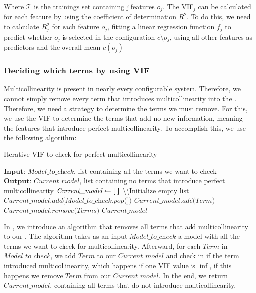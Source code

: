 Where $\mathcal{T}$ is the trainings set containing \textit{j} features $o_j$. The VIF$_{j}$ can be calculated for each feature by using the coefficient
of determination $R^2$. To do this, we need to calculate $R^{2}_j$ for each feature $o_j$, fitting a linear regression function $f_j$ to predict whether $o_j$
is selected in the configuration $c \setminus o_j$, using all other features as predictors and the overall mean $\overline{c}(o_j)$~\cite{Multicollinearity}.

\subsubsection{Deciding which terms by using VIF}
Multicollinearity is present in nearly every configurable system. 
Therefore, we cannot simply remove every term that introduces multicollinearity into the {\perfInfluenceModel}. 
Therefore, we need a strategy to determine the terms we must remove. For this, we use the VIF to determine the terms that add no new information, 
meaning the features that introduce perfect multicollinearity. To accomplish this, we use the following algorithm:

\begin{algorithm}
    \caption{Iterative VIF to check for perfect multicollinearity}\label{alg:vif_iterative}
    \begin{algorithmic}[1]
    \State $\textbf{Input: } \textit{Model\_to\_check}$, list containing all the terms we want to check 
    \State $\textbf{Output: } \textit{Current\_model}$, list containing no terms that introduce perfect multicollinearity
    \State $\textit{Current\_model} \gets \textbf{[\;]}$ \textbackslash\textbackslash Initialize empty list
    \State $\textit{Current\_model.add(Model\_to\_check.pop())} $ \label{alg:vif_add_item}
        \State $\textit{Current\_model.add(Term)}$
        \label{alg:vif_check} \\    
            \qquad$\textit{Current\_model.remove(Terms)}$ 
        \EndIf
    \EndFor
    \State\Return $\textit{Current\_model}$

    \end{algorithmic}
\end{algorithm}

In , we introduce an algorithm that removes all terms that add multicollinearity to our {\perfInfluenceModel}. 
The algorithm takes as an input $\textit{Model\_to\_check}$ a model with all the terms we want to check for multicollinearity. 
Afterward, for each $\textit{Term}$ in $\textit{Model\_to\_check}$, 
we add $\textit{Term}$ to our $\textit{Current\_model}$ and check in  if the term introduced multicollinearity, 
which happens if one VIF value is $\inf$, if this happens we remove $\textit{Term}$ from our $\textit{Current\_model}$. 
In the end, we return $\textit{Current\_model}$, containing all terms that do not introduce multicollinearity.


